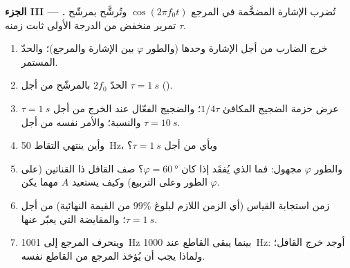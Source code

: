 \begin{problem}
\medskip
\noindent\textbf{الجزء III --- .}
تُضرب الإشارة المضخَّمة في المرجع $\cos(2\pi f_0t)$
وتُرشَّح بمرشّح تمرير منخفض من الدرجة الأولى ثابت زمنه $\tau$.
\begin{enumerate}[resume]
  \item خرج الضارب من أجل الإشارة وحدها (والطور $\varphi$
        بين الإشارة والمرجع)؛ والحدّ المستمر.
  \item {} الحدّ $2f_0$ بالمرشّح من أجل $\tau = \qty{1}{s}$
        ().
  \item عرض حزمة الضجيج المكافئ $1/4\tau$؛ والضجيج الفعّال عند الخرج
        من أجل $\tau = \qty{1}{s}$ والنسبة؛ والأمر نفسه من أجل $\tau = \qty{10}{s}$.
  \item وأين ينتهي التقاط \qty{50}{Hz}، وبأي
         من أجل $\tau = \qty{1}{s}$؟
  \item والطور $\varphi$ مجهول: فما الذي يُفقَد إذا كان $\varphi = \qty{60}{\degree}$؟
        صف القافل ذا القناتين (على الطور وعلى التربيع) وكيف
        يستعيد $A$ مهما يكن $\varphi$.
  \item زمن استجابة القياس (أي الزمن اللازم لبلوغ $99\%$ من
        القيمة النهائية) من أجل $\tau = \qty{1}{s}$؛ والمقايضة التي يعبّر عنها.
  \item وينحرف المرجع إلى \qty{1001}{Hz} بينما يبقى القاطع عند
        \qty{1000}{Hz}: أوجد خرج القافل؛ ولماذا يجب أن يُؤخذ المرجع
        من القاطع نفسه.
\end{enumerate}


\end{problem}
